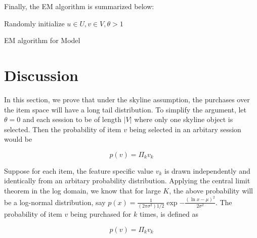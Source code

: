 \documentclass[sigconf]{acmart}
\begin{document}
Finally, the EM algorithm is summarized below:

\begin{algorithm}
Randomly initialize $u \in U, v \in V, \theta >1$\;

\;
\caption{EM algorithm for Model}
\label{algo:EM}
\end{algorithm}

\section{Discussion}

In this section, we prove that under the skyline assumption, the purchases over the item space will have a long tail distribution. To simplify the argument, let $\theta=0$ and each session to be of length $|V|$ where only one skyline object is selected. Then the probability of item $v$ being selected in an arbitary session would be 

\begin{equation*}
p(v)=\Pi_k v_k
\end{equation*}

Suppose for each item, the feature specific value $v_k$ is drawn independently and identically from an arbitary probability distribution. Applying the central limit theorem in the log domain, we know that for large $K$, the above probability will be a log-normal distribution, say $p(x)=\frac{1}{{(2\pi\sigma^2)}{1/2}}\exp{-\frac{{(\ln x - \mu)}^2}{2\sigma^2}}$. The probability of item $v$ being purchased for $k$ times, is defined as 

\begin{equation*}
p(v)=\Pi_k v_k
\end{equation*}
\end{document}
